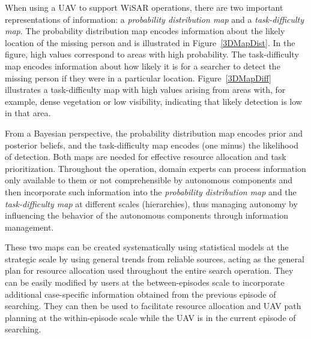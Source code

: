 When using a UAV to support WiSAR operations, there are two important representations of information: a \textit{probability distribution map} and a \textit{task-difficulty map}. The probability distribution map encodes information about the likely location of the missing person and is illustrated in Figure~\ref{3DMapDist}. In the figure, high values correspond to areas with high probability. The task-difficulty map encodes information about how likely it is for a searcher to detect the missing person if they were in a particular location. Figure~\ref{3DMapDiff} illustrates a task-difficulty map with high values arising from areas with, for example, dense vegetation or low visibility, indicating that likely detection is low in that area. 

From a Bayesian perspective, the probability distribution map encodes prior and posterior beliefs, and the task-difficulty map encodes (one minus) the likelihood of detection. Both maps are needed for effective resource allocation and task prioritization. Throughout the operation, domain experts can process information only available to them or not comprehensible by autonomous components and then incorporate such information into the \textit{probability distribution map} and the \textit{task-difficulty map} at different scales (hierarchies), thus managing autonomy by influencing the behavior of the autonomous components through information management. 

These two maps can be created systematically using statistical models at the strategic scale by using general trends from reliable sources, acting as the general plan for resource allocation used throughout the entire search operation. They can be easily modified by users at the between-episodes scale to incorporate additional case-specific information obtained from the previous episode of searching. They can then be used to facilitate resource allocation and UAV path planning at the within-episode scale while the UAV is in the current episode of searching. 


